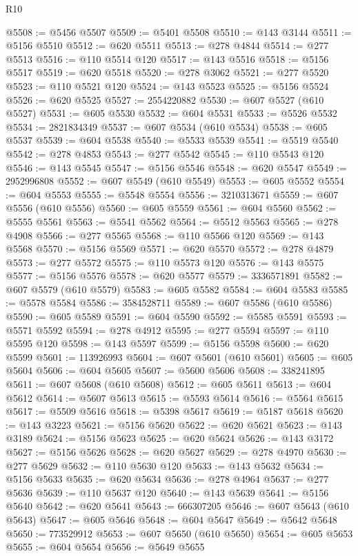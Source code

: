 \begin{lexlean}{R10}
\begin{coremodule}
{{{{{{{{{{{{{{{{{{{{{{{{{{{{{{{{{{{{{{{{{{{{{{{{{{{{{{{{{{{{{{{{{{{{{{{{{{{{{{{{{{{{@5508 := @5456 @5507
@5509 := @5401 @5508
@5510 := @143 @3144
@5511 := @5156 @5510
@5512 := @620 @5511
@5513 := @278 @4844
@5514 := @277 @5513
@5516 := @110 @5514 @120
@5517 := @143 @5516
@5518 := @5156 @5517
@5519 := @620 @5518
@5520 := @278 @3062
@5521 := @277 @5520
@5523 := @110 @5521 @120
@5524 := @143 @5523
@5525 := @5156 @5524
@5526 := @620 @5525
@5527 := 2554220882
@5530 := @607 @5527 (@610 @5527)
@5531 := @605 @5530
@5532 := @604 @5531
@5533 := @5526 @5532
@5534 := 2821834349
@5537 := @607 @5534 (@610 @5534)
@5538 := @605 @5537
@5539 := @604 @5538
@5540 := @5533 @5539
@5541 := @5519 @5540
@5542 := @278 @4853
@5543 := @277 @5542
@5545 := @110 @5543 @120
@5546 := @143 @5545
@5547 := @5156 @5546
@5548 := @620 @5547
@5549 := 2952996808
@5552 := @607 @5549 (@610 @5549)
@5553 := @605 @5552
@5554 := @604 @5553
@5555 := @5548 @5554
@5556 := 3210313671
@5559 := @607 @5556 (@610 @5556)
@5560 := @605 @5559
@5561 := @604 @5560
@5562 := @5555 @5561
@5563 := @5541 @5562
@5564 := @5512 @5563
@5565 := @278 @4908
@5566 := @277 @5565
@5568 := @110 @5566 @120
@5569 := @143 @5568
@5570 := @5156 @5569
@5571 := @620 @5570
@5572 := @278 @4879
@5573 := @277 @5572
@5575 := @110 @5573 @120
@5576 := @143 @5575
@5577 := @5156 @5576
@5578 := @620 @5577
@5579 := 3336571891
@5582 := @607 @5579 (@610 @5579)
@5583 := @605 @5582
@5584 := @604 @5583
@5585 := @5578 @5584
@5586 := 3584528711
@5589 := @607 @5586 (@610 @5586)
@5590 := @605 @5589
@5591 := @604 @5590
@5592 := @5585 @5591
@5593 := @5571 @5592
@5594 := @278 @4912
@5595 := @277 @5594
@5597 := @110 @5595 @120
@5598 := @143 @5597
@5599 := @5156 @5598
@5600 := @620 @5599
@5601 := 113926993
@5604 := @607 @5601 (@610 @5601)
@5605 := @605 @5604
@5606 := @604 @5605
@5607 := @5600 @5606
@5608 := 338241895
@5611 := @607 @5608 (@610 @5608)
@5612 := @605 @5611
@5613 := @604 @5612
@5614 := @5607 @5613
@5615 := @5593 @5614
@5616 := @5564 @5615
@5617 := @5509 @5616
@5618 := @5398 @5617
@5619 := @5187 @5618
@5620 := @143 @3223
@5621 := @5156 @5620
@5622 := @620 @5621
@5623 := @143 @3189
@5624 := @5156 @5623
@5625 := @620 @5624
@5626 := @143 @3172
@5627 := @5156 @5626
@5628 := @620 @5627
@5629 := @278 @4970
@5630 := @277 @5629
@5632 := @110 @5630 @120
@5633 := @143 @5632
@5634 := @5156 @5633
@5635 := @620 @5634
@5636 := @278 @4964
@5637 := @277 @5636
@5639 := @110 @5637 @120
@5640 := @143 @5639
@5641 := @5156 @5640
@5642 := @620 @5641
@5643 := 666307205
@5646 := @607 @5643 (@610 @5643)
@5647 := @605 @5646
@5648 := @604 @5647
@5649 := @5642 @5648
@5650 := 773529912
@5653 := @607 @5650 (@610 @5650)
@5654 := @605 @5653
@5655 := @604 @5654
@5656 := @5649 @5655
}}}}}}}}}}}}}}}}}}}}}}}}}}}}}}}}}}}}}}}}}}}}}}}}}}}}}}}}}}}}}}}}}}}}}}}}}}}}}}}}}}}}
\end{coremodule}
\end{lexlean}
